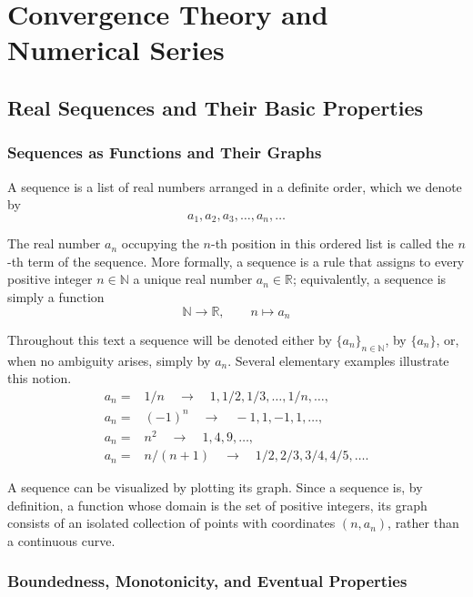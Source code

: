 \chapter{Convergence Theory and Numerical Series}

\section{Real Sequences and Their Basic Properties}

\subsection{Sequences as Functions and Their Graphs}

A sequence is a list of real numbers arranged in a definite order, which we denote by
\[
a_1, a_2, a_3, \dots, a_n, \dots
\]

The real number $a_n$ occupying the $n$-th position in this ordered list is called the $n$-th term of the sequence. More formally, a sequence is a
rule that assigns to every positive integer $n \in \mathbb{N}$ a unique real number $a_n \in \mathbb{R}$; equivalently, a sequence is simply a function
\[
\mathbb{N} \to \mathbb{R}, \qquad n \mapsto a_n
\]

Throughout this text a sequence will be denoted either by $\{a_n\}_{n \in \mathbb{N}}$, by $\{a_n\}$, or, when no ambiguity arises, simply by $a_n$.
Several elementary examples illustrate this notion.
\begin{align*}
a_n =& 1/n \quad \rightarrow \quad 1, 1/2, 1/3, \dots, 1/n, \dots, \\
a_n =& (-1)^n \quad \rightarrow \quad -1, 1, -1, 1, \dots, \\
a_n =& n^2 \quad \rightarrow \quad 1, 4, 9, \dots, \\
a_n =& n/(n+1) \quad \rightarrow \quad 1/2, 2/3, 3/4, 4/5, \dots.
\end{align*}

A sequence can be visualized by plotting its graph. Since a sequence is, by definition, a function whose domain is the set of positive integers,
its graph consists of an isolated collection of points with coordinates $(n, a_n)$, rather than a continuous curve.


\subsection{Boundedness, Monotonicity, and Eventual Properties}

